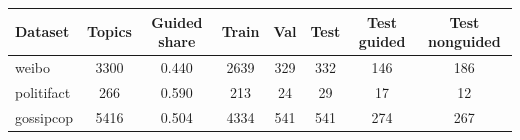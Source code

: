 \begin{tabular}{lccccccc}
\hline
Dataset & Topics & Guided share & Train & Val & Test & Test guided & Test nonguided \\
\hline
weibo & 3300 & 0.440 & 2639 & 329 & 332 & 146 & 186 \\
politifact & 266 & 0.590 & 213 & 24 & 29 & 17 & 12 \\
gossipcop & 5416 & 0.504 & 4334 & 541 & 541 & 274 & 267 \\
\hline
\end{tabular}
